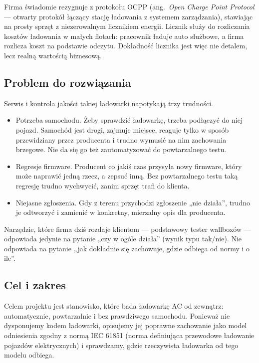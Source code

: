 \documentclass[11pt]{article}
\newcommand{\key}[1]{#1}
\begin{document}
Firma świadomie rezygnuje z protokołu OCPP (ang.\ \textit{Open Charge Point Protocol} --- otwarty protokół łączący stację ładowania z systemem zarządzania), stawiając na prosty sprzęt z niezerowalnym licznikiem energii. Licznik służy do rozliczania kosztów ładowania w małych flotach: pracownik ładuje auto służbowe, a firma rozlicza koszt na podstawie odczytu. Dokładność licznika jest więc nie detalem, lecz realną wartością biznesową.

\subsection{Problem do rozwiązania}

Serwis i kontrola jakości takiej ładowarki napotykają trzy trudności.

\begin{itemize}
  \item \key{Potrzeba samochodu.} Żeby sprawdzić ładowarkę, trzeba podłączyć do niej pojazd. Samochód jest drogi, zajmuje miejsce, reaguje tylko w sposób przewidziany przez producenta i trudno wymusić na nim zachowania brzegowe. Nie da się go też zautomatyzować do powtarzalnego testu.
  \item \key{Regresje firmware.} Producent co jakiś czas przysyła nowy firmware, który może naprawić jedną rzecz, a zepsuć inną. Bez powtarzalnego testu taką regresję trudno wychwycić, zanim sprzęt trafi do klienta.
  \item \key{Niejasne zgłoszenia.} Gdy z terenu przychodzi zgłoszenie „nie działa”, trudno je odtworzyć i zamienić w konkretny, mierzalny opis dla producenta.
\end{itemize}

Narzędzie, które firma dziś rozdaje klientom --- podstawowy tester wallboxów --- odpowiada jedynie na pytanie \key{„czy w ogóle działa”} (wynik typu tak/nie). Nie odpowiada na pytanie \key{„jak dokładnie się zachowuje, gdzie odbiega od normy i o ile”}.

\subsection{Cel i zakres}

Celem projektu jest stanowisko, które bada ładowarkę AC \key{od zewnątrz}: automatycznie, powtarzalnie i bez prawdziwego samochodu. Ponieważ nie dysponujemy kodem ładowarki, opisujemy jej poprawne zachowanie jako \key{model odniesienia} zgodny z normą IEC 61851 (norma definiująca przewodowe ładowanie pojazdów elektrycznych) i sprawdzamy, gdzie rzeczywista ładowarka od tego modelu odbiega.
\end{document}
